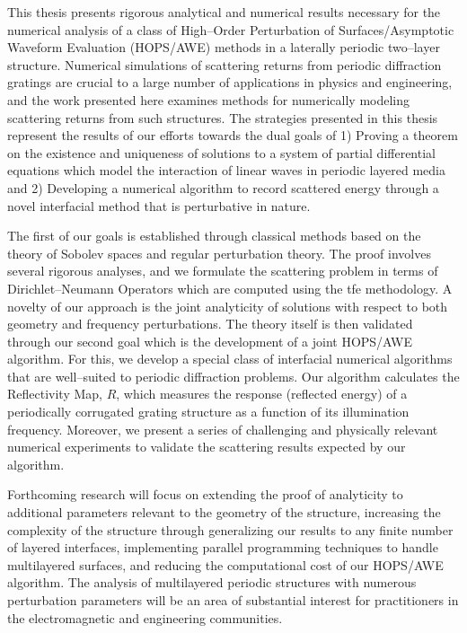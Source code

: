 \summary
{}
\label{Sec:Summary}
This thesis presents rigorous analytical and numerical results necessary for the numerical analysis of a class of High--Order Perturbation of Surfaces/Asymptotic Waveform Evaluation (HOPS/AWE) methods in a laterally periodic two--layer structure. Numerical simulations of scattering returns from periodic diffraction gratings are crucial to a large number of applications in physics and engineering, and the work presented here examines methods for numerically modeling scattering returns from such structures.  The strategies presented in this thesis represent the results of our efforts towards the dual goals of 1) Proving a theorem on the existence and uniqueness of solutions to a system of partial differential equations which model the interaction of linear waves in periodic layered media and 2) Developing a numerical algorithm to record scattered energy through a novel interfacial method that is perturbative in nature.


The first of our goals is established through classical methods based on the theory of Sobolev spaces and regular perturbation theory. The proof involves several rigorous analyses, and we formulate the scattering problem in terms of Dirichlet--Neumann Operators which are computed using the \gls{tfe} methodology. A novelty of our approach is the joint analyticity of solutions with respect to both geometry and frequency perturbations. The theory itself is then validated through our second goal which is the development of a joint HOPS/AWE algorithm. For this, we develop a special class of interfacial numerical
algorithms that are well--suited to periodic diffraction problems. Our algorithm calculates the Reflectivity Map, $R$, which measures the response (reflected energy) of a
periodically corrugated grating structure as a function of its illumination frequency. Moreover, we present a series of challenging and physically relevant numerical experiments to validate the scattering results expected by our algorithm.

Forthcoming research will focus on extending the proof of analyticity to additional parameters relevant to the geometry of the structure, increasing the complexity of the structure through generalizing our results to any finite number of layered interfaces, implementing parallel programming techniques to handle multilayered surfaces, and reducing the computational cost of our HOPS/AWE algorithm. The analysis of multilayered periodic structures with numerous perturbation parameters will be an area of substantial interest for practitioners in the electromagnetic and engineering communities.
